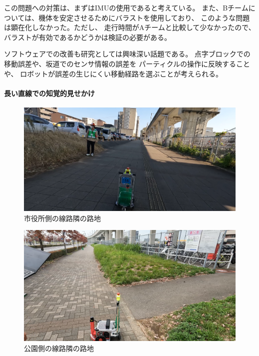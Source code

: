 \documentclass[twocolumn,9pt]{jsproceedings}
\begin{document}
この問題への対策は、まずはIMUの使用であると考えている。
また、Bチームについては、機体を安定させるためにバラストを使用しており、
このような問題は顕在化しなかった。ただし、
走行時間がAチームと比較して少なかったので、
バラストが有効であるかどうかは検証の必要がある。

ソフトウェアでの改善も研究としては興味深い話題である。
点字ブロックでの移動誤差や、坂道でのセンサ情報の誤差を
パーティクルの操作に反映することや、
ロボットが誤差の生じにくい移動経路を選ぶことが考えられる。

\paragraph{長い直線での知覚的見せかけ}

\begin{figure}[h]
  \begin{center}
    \includegraphics[width=1.0\linewidth]{figs/city_hall_side_alley.pdf}
    \caption{市役所側の線路隣の路地}
    \label{fig:city_hall_side_alley}
  \end{center}
\end{figure}

\begin{figure}[h]
  \begin{center}
    \includegraphics[width=1.0\linewidth]{figs/park_side_alley.pdf}
    \caption{公園側の線路隣の路地}
    \label{fig:park_side_alley}
  \end{center}
\end{figure}
\end{document}
